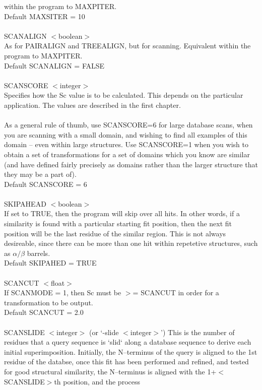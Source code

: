 within the program to MAXPITER.\\
Default MAXSITER = 10\\
\\
SCANALIGN $<$boolean$>$\\
As for PAIRALIGN and TREEALIGN, but for scanning.  Equivalent
within the program to MAXPITER.\\
Default SCANALIGN = FALSE\\
\\
SCANSCORE $<$integer$>$\\
Specifies how the Sc value is to be calculated.  This depends on
the particular application.  The values are described in the
first chapter.\\
\\
As a general rule of thumb, use SCANSCORE=6 for large database
scans, when you are scanning with a small domain, and wishing to
find all examples of this domain -- even within large structures. 
Use SCANSCORE=1 when  you wish to obtain a set of
transformations for a set of domains which you know are similar
(and have defined fairly precisely as domains rather than the
larger structure that they may be a part of).\\
Default SCANSCORE = 6\\
\\
SKIPAHEAD $<$boolean$>$\\
If set to TRUE, then the program will skip over all hits.  In
other words, if a similarity is found with a particular starting
fit position, then the next fit position will be the last residue
of the similar region.  This is not always desireable, since there can
be more than one hit within  repetetive structures, such as $\alpha/\beta$ barrels.\\
Default SKIPAHED = TRUE\\
\\
SCANCUT $<$float$>$\\
If SCANMODE = 1, then Sc must be $>$= SCANCUT in order for a 
transformation to be output.\\
Default SCANCUT = 2.0\\
\\
SCANSLIDE $<$integer$>$ (or `-slide $<$integer$>$')
This is the number of residues that a query sequence is `slid`
along a database sequence to derive each initial superimposition. 
Initially, the N--terminus of the query is aligned to the 1st
residue of the databse, once this fit has been performed and
refined, and tested for good structural similarity, the N--terminus
is aligned with  the 1+$<$SCANSLIDE$>$th position, and the process
